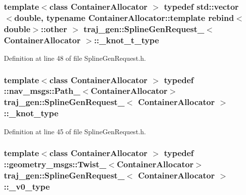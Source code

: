 \subsubsection[{\texorpdfstring{\+\_\+knot\+\_\+t\+\_\+type}{_knot_t_type}}]{\setlength{\rightskip}{0pt plus 5cm}template$<$class Container\+Allocator $>$ typedef std\+::vector$<$double, typename Container\+Allocator\+::template rebind$<$double$>$\+::other $>$ {\bf traj\+\_\+gen\+::\+Spline\+Gen\+Request\+\_\+}$<$ Container\+Allocator $>$\+::{\bf \+\_\+knot\+\_\+t\+\_\+type}}\hypertarget{structtraj__gen_1_1_spline_gen_request___adb20ee842cb5f2dce6ad7994e5590b3f}{}\label{structtraj__gen_1_1_spline_gen_request___adb20ee842cb5f2dce6ad7994e5590b3f}


Definition at line 48 of file Spline\+Gen\+Request.\+h.

\subsubsection[{\texorpdfstring{\+\_\+knot\+\_\+type}{_knot_type}}]{\setlength{\rightskip}{0pt plus 5cm}template$<$class Container\+Allocator $>$ typedef \+::nav\+\_\+msgs\+::\+Path\+\_\+$<$Container\+Allocator$>$ {\bf traj\+\_\+gen\+::\+Spline\+Gen\+Request\+\_\+}$<$ Container\+Allocator $>$\+::{\bf \+\_\+knot\+\_\+type}}\hypertarget{structtraj__gen_1_1_spline_gen_request___a24a664250b46a3a7327876929deac6c4}{}\label{structtraj__gen_1_1_spline_gen_request___a24a664250b46a3a7327876929deac6c4}


Definition at line 45 of file Spline\+Gen\+Request.\+h.

\subsubsection[{\texorpdfstring{\+\_\+v0\+\_\+type}{_v0_type}}]{\setlength{\rightskip}{0pt plus 5cm}template$<$class Container\+Allocator $>$ typedef \+::geometry\+\_\+msgs\+::\+Twist\+\_\+$<$Container\+Allocator$>$ {\bf traj\+\_\+gen\+::\+Spline\+Gen\+Request\+\_\+}$<$ Container\+Allocator $>$\+::{\bf \+\_\+v0\+\_\+type}}\hypertarget{structtraj__gen_1_1_spline_gen_request___ae09e79b3dca72bb90798d17eba2a467a}{}\label{structtraj__gen_1_1_spline_gen_request___ae09e79b3dca72bb90798d17eba2a467a}


